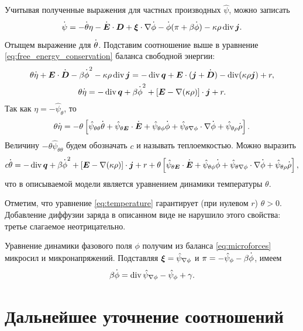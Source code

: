 Учитывая полученные выражения для частных производных $\hat{\psi}$, можно записать
\[
    \overset{\boldsymbol{.}}{\psi} = -\overset{\boldsymbol{.}}{\theta} \eta - \overset{\boldsymbol{.}}{{\boldsymbol{E}}} \cdot {\boldsymbol{D}} + {\boldsymbol{\xi}} \cdot \nabla \overset{\boldsymbol{.}}{\phi} - \overset{\boldsymbol{.}}{\phi} (\pi + \beta \overset{\boldsymbol{.}}{\phi}) - \kappa \rho \operatorname{{div}} {\boldsymbol{j}}.
\]
Отыщем выражение для $\overset{\boldsymbol{.}}{\theta}$. Подставим соотношение выше в уравнение \eqref{eq:free_energy_conservation} баланса свободной энергии:
\begin{gather*}
    \theta \overset{\boldsymbol{.}}{\eta} + {\boldsymbol{E}} \cdot \overset{\boldsymbol{.}}{{\boldsymbol{D}}} - \beta \overset{\boldsymbol{.}}{\phi}^2 - \kappa \rho \operatorname{{div}} {\boldsymbol{j}} = -\operatorname{{div}} {\boldsymbol{q}} + {\boldsymbol{E}} \cdot ({\boldsymbol{j}} + \overset{\boldsymbol{.}}{{\boldsymbol{D}}}) - \operatorname{{div}}(\kappa \rho {\boldsymbol{j}}) + r, \\
    \theta \overset{\boldsymbol{.}}{\eta} = -\operatorname{{div}} {\boldsymbol{q}} + \beta \overset{\boldsymbol{.}}{\phi}^2 + [{\boldsymbol{E}} - \nabla(\kappa \rho)] \cdot {\boldsymbol{j}} + r.
\end{gather*}
Так как $\eta = -\hat{\psi}_\theta$, то
\[
    \theta \overset{\boldsymbol{.}}{\eta} = -\theta \left[ \hat{\psi}_{\theta \theta} \overset{\boldsymbol{.}}{\theta} + \hat{\psi}_{\theta {\boldsymbol{E}}} \cdot \overset{\boldsymbol{.}}{{\boldsymbol{E}}} + \hat{\psi}_{\theta \phi} \overset{\boldsymbol{.}}{\phi} + \hat{\psi}_{\theta \nabla \phi} \cdot \nabla \overset{\boldsymbol{.}}{\phi} + \hat{\psi}_{\theta \rho} \overset{\boldsymbol{.}}{\rho} \right].
\]
Величину $-\theta \hat{\psi}_{\theta \theta}$ будем обозначать $c$ и называть теплоемкостью. Можно выразить
\begin{equation}
    c \overset{\boldsymbol{.}}{\theta} = -\operatorname{{div}} {\boldsymbol{q}} + \beta \overset{\boldsymbol{.}}{\phi}^2 + [{\boldsymbol{E}} - \nabla(\kappa \rho)] \cdot {\boldsymbol{j}} + r + \theta \left[ \hat{\psi}_{\theta {\boldsymbol{E}}} \cdot \overset{\boldsymbol{.}}{{\boldsymbol{E}}} + \hat{\psi}_{\theta \phi} \overset{\boldsymbol{.}}{\phi} + \hat{\psi}_{\theta \nabla \phi} \cdot \nabla \overset{\boldsymbol{.}}{\phi} + \hat{\psi}_{\theta \rho} \overset{\boldsymbol{.}}{\rho} \right],
    \label{eq:temperature}
\end{equation}
что в описываемой модели является уравнением динамики температуры $\theta$.

Отметим, что уравнение \eqref{eq:temperature} гарантирует (при нулевом $r$) $\theta > 0$. Добавление диффузии заряда в описанном виде не нарушило этого свойства: третье слагаемое неотрицательно.

Уравнение динамики фазового поля $\phi$ получим из баланса \eqref{eq:microforces} микросил и микронапряжений. Подставляя ${\boldsymbol{\xi}} = \hat{\psi}_{\nabla \phi}$ и $\pi = -\hat{\psi}_\phi - \beta \overset{\boldsymbol{.}}{\phi}$, имеем
\begin{equation}
    \beta \overset{\boldsymbol{.}}{\phi} = \operatorname{{div}} \hat{\psi}_{\nabla \phi} - \hat{\psi}_\phi + \gamma.
    \label{eq:phi}
\end{equation}


\section{Дальнейшее уточнение соотношений}

